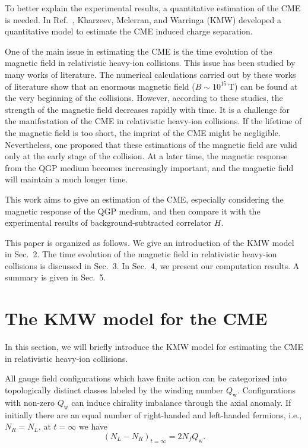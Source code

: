 \documentclass[a4paper,10pt,twoside]{cpc-hepnp}
\begin{document}
\begin{CJK*}{GBK}{song}
\begin{multicols}{2}
To better explain the experimental results, a quantitative estimation of the CME is needed.
In Ref.~\cite{Kharzeev:2007jp}, Kharzeev, Mclerran, and Warringa (KMW) developed a quantitative model to estimate the CME induced charge separation.


One of the main issue in estimating the CME is the time evolution of the magnetic field in relativistic heavy-ion collisions.
This issue has been studied by many works of literature\cite{Kharzeev:2007jp,Skokov:2009qp,Voronyuk:2011jd,Bzdak:2011yy,Deng:2012pc,Tuchin:2013apa,Mo:2013qya}. The numerical calculations carried out by these works of literature show that an enormous magnetic field ($B \sim 10^{15}\,\mathrm{T}$) can be found at the very beginning of the collisions.
However, according to these studies, the strength of the magnetic field decreases rapidly with time.
It is a challenge for the manifestation of the CME in relativistic heavy-ion collisions. If the lifetime of the magnetic field is too short, the imprint of the CME might be negligible.
Nevertheless, one proposed that these estimations of the magnetic field are valid only at the early stage of the collision. At a later time, the magnetic response from the QGP medium becomes increasingly important\cite{Tuchin:2010vs,Tuchin:2010vs2,Deng:2012pc,Tuchin:2013apa,McLerran:2013hla,Tuchin:2013ie,Zakharov:2014dia,Tuchin:2014iua,Tuchin:2015oka}, and the magnetic field will maintain a much longer time.

This work aims to give an estimation of the CME, especially considering the magnetic response of the QGP medium, and then compare it with the experimental results of background-subtracted correlator $H$.

This paper is organized as follows. We give an introduction of the KMW model in Sec.~2. The time evolution of the magnetic field in relativistic heavy-ion collisions is discussed in Sec.~3. In Sec.~4, we present our computation results. A summary is given in Sec.~5.


\section{The KMW model for the CME}\label{KMWmodel}

In this section, we will briefly introduce the KMW model for estimating the CME in relativistic heavy-ion collisions.

All gauge field configurations which have finite action can be categorized into topologically distinct classes labeled by the winding number $Q_\text{w}$. Configurations with non-zero $Q_\text{w}$ can induce chirality imbalance through the axial anomaly. If initially there are an equal number of right-handed and left-handed fermions, i.e., $N_R = N_L$, at $t = \infty$ we have
\begin{equation}
(N_L - N_R)_{t=\infty} = 2N_f Q_\text{w}.
\end{equation}


\end{multicols}
\end{CJK*}
\end{document}
